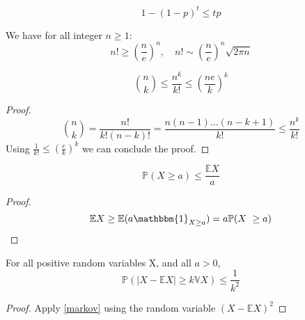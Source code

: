 \begin{theorem}\label{bernoulli}
	\begin{equation}
		1 - (1-p)^t \leq tp
	\end{equation}
\end{theorem}

\begin{theorem}\label{stirling} 
	We have for all integer $n\geq 1$:
	\begin{equation}
		n! \geq (\frac{n}{e})^n ,\quad	n! \sim (\frac{n}{e})^n \sqrt{2\pi n}
	\end{equation}
\end{theorem}

\begin{corollary}\label{th:NChooseK}
	\begin{equation}
		\binom{n}{k} \leq \frac{n^k}{k!} \leq (\frac{ne}{k})^k
	\end{equation}
\end{corollary}
\begin{proof}
	\begin{equation}
		\binom{n}{k} 	= \frac{n!}{k!(n-k)!} = \frac{n(n-1)\ldots(n-k+1)}{k!} \leq \frac{n^k}{k!}  
	\end{equation}
	Using $\frac{1}{k!} \leq (\frac{e}{k})^k$ we can conclude the proof.
\end{proof}
	\begin{theorem}\label{markov}
	\begin{equation}
		\mathbb{P}(X \geq a) \leq \frac{\mathbb{E}X}{a}
	\end{equation}
\end{theorem}
\begin{proof}
    \begin{equation}
	    \mathbb{E}X \geq \mathbb{E}(a\mathbbm{1}_{X\geq a} ) = a \mathbb{P}(X \geq a)
    \end{equation}
\end{proof}
\begin{corollary}\label{cheby} 
	For all positive random variables X, and all $a>0$,
	\begin{equation}
		\mathbb{P}(|X - \mathbb{E}X| \geq k \mathbb{V}X ) \leq \frac{1}{k^2}
	\end{equation}
\end{corollary}
\begin{proof}
    Apply \eqref{markov} using the random variable $(X-\mathbb{E}X)^2$
\end{proof}
